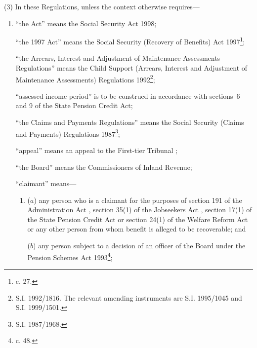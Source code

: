 \documentclass[12pt,a4paper]{article}
\begin{document}
(3) In these Regulations, unless the context otherwise requires—
\begin{enumerate}\item[]
“the Act” means the Social Security Act 1998;

“the 1997 Act” means the Social Security (Recovery of Benefits) Act 1997\footnote{ c. 27.};

“the Arrears, Interest and Adjustment of Maintenance Assessments Regulations” means the Child Support (Arrears, Interest and Adjustment of Maintenance Assessments) Regulations 1992\footnote{\frenchspacing S.I. 1992/1816. The relevant amending instruments are S.I. 1995/1045 and S.I. 1999/1501.};

“assessed income period” is to be construed in accordance with sections~6 and 9 of the State Pension Credit Act;

“the Claims and Payments Regulations” means the Social Security (Claims and Payments) Regulations 1987\footnote{\frenchspacing S.I. 1987/1968.};

“appeal” means an appeal to 
the First-tier Tribunal%
;

“the Board” means the Commissioners of Inland Revenue;

“claimant” means—
\begin{enumerate}\item[]
($a$) any person who is a claimant for the purposes of section 191 of the Administration Act%
, section 35(1) of the Jobseekers Act%
, section 17(1) of the State Pension Credit Act or section 24(1) of the Welfare Reform Act  %
or any other person from whom benefit is alleged to be recoverable; and

($b$) any person subject to a decision of 
an officer of the Board  %
under the Pension Schemes Act 1993\footnote{ c. 48.};
\end{enumerate}


\end{enumerate}
\end{document}
